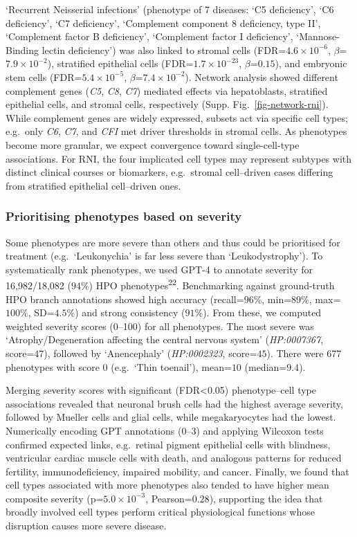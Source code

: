 \documentclass[
]{article}
\begin{document}
`Recurrent Neisserial infections' (phenotype of 7 diseases: `C5
deficiency', `C6 deficiency', `C7 deficiency', `Complement component 8
deficiency, type II', `Complement factor B deficiency', `Complement
factor I deficiency', `Mannose-Binding lectin deficiency') was also
linked to stromal cells (FDR=\(4.6 \times 10^{-6}\),
\(\beta\)=\(7.9 \times 10^{-2}\)), stratified epithelial cells
(FDR=\(1.7 \times 10^{-23}\), \(\beta\)=\(0.15\)), and embryonic stem
cells (FDR=\(5.4 \times 10^{-5}\), \(\beta\)=\(7.4 \times 10^{-2}\)).
Network analysis showed different complement genes (\emph{C5},
\emph{C8}, \emph{C7}) mediated effects via hepatoblasts, stratified
epithelial cells, and stromal cells, respectively (Supp.
Fig.~\ref{fig-network-rni}). While complement genes are widely
expressed, subsets act via specific cell types; e.g.~only \emph{C6},
\emph{C7}, and \emph{CFI} met driver thresholds in stromal cells. As
phenotypes become more granular, we expect convergence toward
single-cell-type associations. For RNI, the four implicated cell types
may represent subtypes with distinct clinical courses or biomarkers,
e.g.~stromal cell--driven cases differing from stratified epithelial
cell--driven ones.

\subsubsection{Prioritising phenotypes based on
severity}\label{prioritising-phenotypes-based-on-severity}

Some phenotypes are more severe than others and thus could be
prioritised for treatment (e.g.~`Leukonychia' is far less severe than
`Leukodystrophy'). To systematically rank phenotypes, we used GPT-4 to
annotate severity for 16,982/18,082 (\(94\)\%) HPO
phenotypes\textsuperscript{22}. Benchmarking against ground-truth HPO
branch annotations showed high accuracy (recall=\(96\)\%, min=\(89\)\%,
max=\(100\)\%, SD=\(4.5\)\%) and strong consistency (\(91\)\%). From
these, we computed weighted severity scores (0--100) for all phenotypes.
The most severe was `Atrophy/Degeneration affecting the central nervous
system' (\emph{HP:0007367}, score=\(47\)), followed by `Anencephaly'
(\emph{HP:0002323}, score=\(45\)). There were 677 phenotypes with score
0 (e.g.~`Thin toenail'), mean=\(10\) (median=\(9.4\)).

Merging severity scores with significant (FDR\textless0.05)
phenotype--cell type associations revealed that neuronal brush cells had
the highest average severity, followed by Mueller cells and glial cells,
while megakaryocytes had the lowest. Numerically encoding GPT
annotations (0--3) and applying Wilcoxon tests confirmed expected links,
e.g.~retinal pigment epithelial cells with blindness, ventricular
cardiac muscle cells with death, and analogous patterns for reduced
fertility, immunodeficiency, impaired mobility, and cancer. Finally, we
found that cell types associated with more phenotypes also tended to
have higher mean composite severity (p=\(5.0 \times 10^{-3}\),
Pearson=\(0.28\)), supporting the idea that broadly involved cell types
perform critical physiological functions whose disruption causes more
severe disease.
\end{document}

